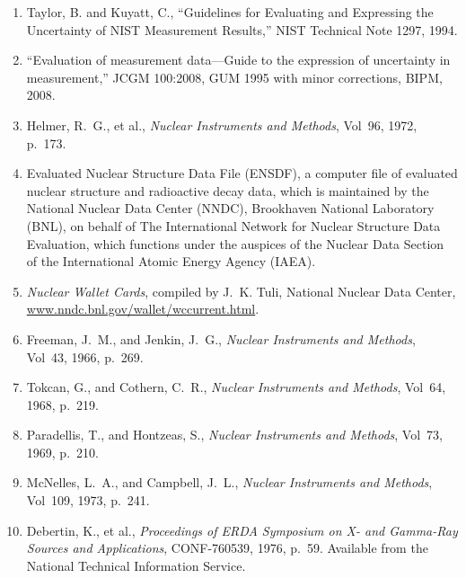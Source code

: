 \documentclass[12pt]{article}
\begin{document}
\begin{enumerate}[label=(\arabic*),leftmargin=3em]
  \item Taylor, B. and Kuyatt, C., ``Guidelines for Evaluating and Expressing the
        Uncertainty of NIST Measurement Results,'' NIST Technical Note 1297, 1994.

  \item ``Evaluation of measurement data---Guide to the expression of uncertainty in
        measurement,'' JCGM 100:2008, GUM 1995 with minor corrections, BIPM, 2008.

  \item Helmer, R.~G., et al., \textit{Nuclear Instruments and Methods}, Vol~96, 1972,
        p.~173.

  \item Evaluated Nuclear Structure Data File (ENSDF), a computer file of evaluated
        nuclear structure and radioactive decay data, which is maintained by the National
        Nuclear Data Center (NNDC), Brookhaven National Laboratory (BNL), on behalf of
        The International Network for Nuclear Structure Data Evaluation, which functions
        under the auspices of the Nuclear Data Section of the International Atomic Energy
        Agency (IAEA).

  \item \textit{Nuclear Wallet Cards}, compiled by J.~K. Tuli, National Nuclear Data
        Center, \url{www.nndc.bnl.gov/wallet/wccurrent.html}.

  \item Freeman, J.~M., and Jenkin, J.~G., \textit{Nuclear Instruments and Methods},
        Vol~43, 1966, p.~269.

  \item Tokcan, G., and Cothern, C.~R., \textit{Nuclear Instruments and Methods},
        Vol~64, 1968, p.~219.

  \item Paradellis, T., and Hontzeas, S., \textit{Nuclear Instruments and Methods},
        Vol~73, 1969, p.~210.

  \item McNelles, L.~A., and Campbell, J.~L., \textit{Nuclear Instruments and Methods},
        Vol~109, 1973, p.~241.

  \item Debertin, K., et al., \textit{Proceedings of ERDA Symposium on X- and Gamma-Ray
        Sources and Applications}, CONF-760539, 1976, p.~59. Available from the National
        Technical Information Service.


\end{enumerate}
\end{document}
